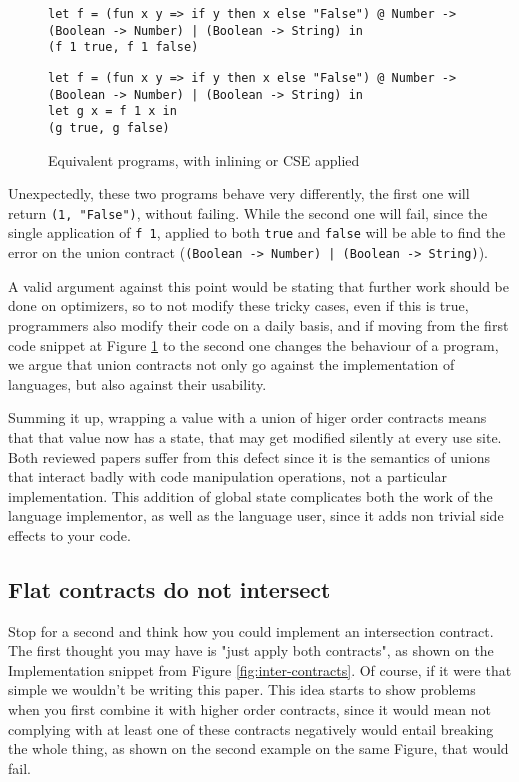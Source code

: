 \documentclass[sigplan,10pt,review,anonymous]{acmart}
\newcommand{\nickel}[1]{\lstinline[language=nickel]{#1}}
\begin{document}
\begin{figure}[h]
\begin{lstlisting}[language=nickel, title=Inlined]
let f = (fun x y => if y then x else "False") @ Number -> (Boolean -> Number) | (Boolean -> String) in
(f 1 true, f 1 false)
\end{lstlisting}
\begin{lstlisting}[language=nickel, title=Common Subexpression Eliminated]
let f = (fun x y => if y then x else "False") @ Number -> (Boolean -> Number) | (Boolean -> String) in
let g x = f 1 x in
(g true, g false)
\end{lstlisting}
\caption{Equivalent programs, with inlining or CSE applied}
\label{fig:optimized-programs}
\end{figure}

Unexpectedly, these two programs behave very differently, the first one will return
\nickel{(1, "False")}, without failing.
While the second one will fail, since the single application of \nickel{f 1},
applied to both \nickel{true} and \nickel{false} will be able to find the error
on the union contract (\nickel{(Boolean -> Number) | (Boolean -> String)}).

A valid argument against this point would be stating that further work should be done
on optimizers, so to not modify these tricky cases, even if this is true,
programmers also modify their code on a daily basis, and if moving from the first
code snippet at Figure \ref{fig:optimized-programs} to the second one changes
the behaviour of a program, we argue that union contracts not only go against the
implementation of languages, but also against their usability.

Summing it up, wrapping a value with a union of higer order contracts means that
that value now has a state, that may get modified silently at every use site.
Both reviewed papers suffer from this defect since it is the semantics
of unions that interact badly with code manipulation operations,
not a particular implementation.
This addition of global state complicates both the work of the language
implementor, as well as the language user, since it adds non trivial
side effects to your code.


\subsection*{Flat contracts do not intersect}

Stop for a second and think how you could implement an intersection
contract. The first thought you may have is "just apply
both contracts", as shown on the Implementation snippet
from Figure \ref{fig:inter-contracts}.
Of course, if it were that simple we wouldn't be writing this paper.
This idea starts to show problems when you first combine it with
higher order contracts, since it would mean not complying with
at least one of these contracts negatively would entail breaking the
whole thing, as shown on the second example on the same Figure,
that would fail.
\end{document}
